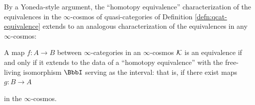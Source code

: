 By a Yoneda-style argument, the ``homotopy equivalence'' characterization of the equivalences in the $\infty$-cosmos of quasi-categories of Definition \ref{defn:qcat-equivalence} extends to an analogous characterization of the equivalences in any $\infty$-cosmos:

\begin{lemma}\label{lem:equiv-htpy-equiv}
A map $f \colon A \to B$ between $\infty$-categories in an $\infty$-cosmos ${\mathord{\mathcal{K}}}$ is an equivalence if and only if it extends to the data of a ``homotopy equivalence'' with the free-living isomorphism $\iso$ serving as the interval: that is, if there exist maps $g \colon B \to A$
\begin{center}
\end{center}
in the $\infty$-cosmos.
\end{lemma}
